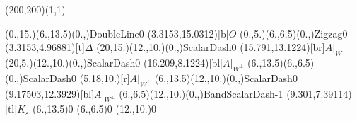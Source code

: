 \unitlength=1bp%

\begin{feynartspicture}(200,200)(1,1)

\FADiagram{}
\FAProp(0.,15.)(6.,13.5)(0.,){DoubleLine}{0}
\FALabel(3.3153,15.0312)[b]{$O$}
\FAProp(0.,5.)(6.,6.5)(0.,){Zigzag}{0}
\FALabel(3.3153,4.96881)[t]{$\Delta$}
\FAProp(20,15.)(12.,10.)(0.,){ScalarDash}{0}
\FALabel(15.791,13.1224)[br]{$A|_{W^\perp}$}
\FAProp(20,5.)(12.,10.)(0.,){ScalarDash}{0}
\FALabel(16.209,8.1224)[bl]{$A|_{W^\perp}$}
\FAProp(6.,13.5)(6.,6.5)(0.,){ScalarDash}{0}
\FALabel(5.18,10.)[r]{$A|_{W^\perp}$}
\FAProp(6.,13.5)(12.,10.)(0.,){ScalarDash}{0}
\FALabel(9.17503,12.3929)[bl]{$A|_{W^\perp}$}
\FAProp(6.,6.5)(12.,10.)(0.,){BandScalarDash}{-1}
\FALabel(9.301,7.39114)[tl]{$K_\varepsilon$}
\FAVert(6.,13.5){0}
\FAVert(6.,6.5){0}
\FAVert(12.,10.){0}
\end{feynartspicture}

